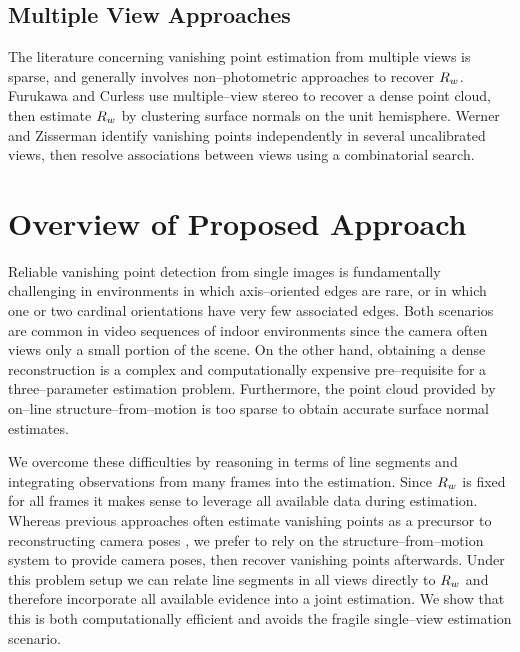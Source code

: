 
\subsection{Multiple View Approaches}

The literature concerning vanishing point estimation from multiple
views is sparse, and generally involves non--photometric approaches to
recover $\SceneR$. Furukawa and Curless \cite{Furukawa09} use
multiple--view stereo to recover a dense point cloud, then estimate
$\SceneR$ by clustering surface normals on the unit hemisphere. Werner
and Zisserman \cite{Werner2002} identify vanishing points
independently in several uncalibrated views, then resolve associations
between views using a combinatorial search.

\section{Overview of Proposed Approach}

Reliable vanishing point detection from single images is fundamentally
challenging in environments in which axis--oriented edges are rare, or
in which one or two cardinal orientations have very few associated
edges. Both scenarios are common in video sequences of indoor
environments since the camera often views only a small portion of the
scene. On the other hand, obtaining a dense reconstruction is a
complex and computationally expensive pre--requisite for a
three--parameter estimation problem. Furthermore, the point cloud
provided by on--line structure--from--motion is too sparse to obtain
accurate surface normal estimates.

We overcome these difficulties by reasoning in terms of line
segments and integrating observations from many frames into the
estimation. Since $\SceneR$ is fixed for all frames it makes sense to
leverage all available data during estimation. Whereas previous
approaches often estimate vanishing points as a precursor to
reconstructing camera poses \cite{Zhang02,Werner2002}, we prefer to rely
on the structure--from--motion system to provide camera poses,
then recover vanishing points afterwards. Under this problem setup we
can relate line segments in all views directly to $\SceneR$ and
therefore incorporate all available evidence into a joint
estimation. We show that this is both computationally efficient and
avoids the fragile single--view estimation scenario.

